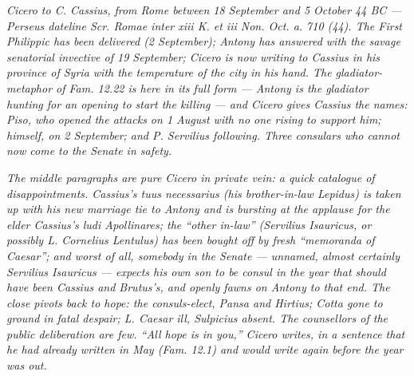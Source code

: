 
\textit{Cicero to C. Cassius, from Rome between 18 September and
5 October 44 BC --- Perseus dateline \textit{Scr. Romae inter
xiii K. et iii Non. Oct. a. 710 (44)}. The First Philippic has been
delivered (2 September); Antony has answered with the savage senatorial
invective of 19 September; Cicero is now writing to Cassius in his
province of Syria with the temperature of the city in his hand. The
gladiator-metaphor of \textit{Fam.} 12.22 is here in its full form ---
Antony is the \textit{gladiator} hunting for an opening to start the
killing --- and Cicero gives Cassius the names: Piso, who opened the
attacks on 1 August with no one rising to support him; himself, on
2 September; and P. Servilius following. Three consulars who cannot
now come to the Senate in safety.}

\textit{The middle paragraphs are pure Cicero in private vein: a quick
catalogue of disappointments. Cassius's \textit{tuus necessarius} (his
brother-in-law Lepidus) is taken up with his new marriage tie to
Antony and is bursting at the applause for the elder Cassius's
\textit{ludi Apollinares}; the ``other in-law'' (Servilius Isauricus,
or possibly L. Cornelius Lentulus) has been bought off by fresh
``memoranda of Caesar''; and worst of all, somebody in the Senate ---
unnamed, almost certainly Servilius Isauricus --- expects his own son
to be consul in the year that should have been Cassius and Brutus's,
and openly fawns on Antony to that end. The close pivots back to
hope: the consuls-elect, Pansa and Hirtius; Cotta gone to ground in
fatal despair; L. Caesar ill, Sulpicius absent. The counsellors of
the public deliberation are few. ``All hope is in you,'' Cicero
writes, in a sentence that he had already written in May (\textit{Fam.}
12.1) and would write again before the year was out.}
